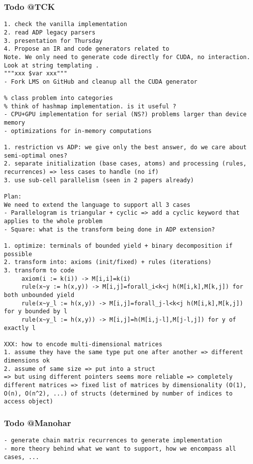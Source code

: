 \subsubsection*{Todo @TCK}
\begin{verbatim}
1. check the vanilla implementation
2. read ADP legacy parsers
3. presentation for Thursday
4. Propose an IR and code generators related to
Note. We only need to generate code directly for CUDA, no interaction. Look at string templating .
"""xxx $var xxx"""
- Fork LMS on GitHub and cleanup all the CUDA generator

% class problem into categories
% think of hashmap implementation. is it useful ?
- CPU+GPU implementation for serial (NS?) problems larger than device memory
- optimizations for in-memory computations

1. restriction vs ADP: we give only the best answer, do we care about semi-optimal ones?
2. separate initialization (base cases, atoms) and processing (rules, recurrences) => less cases to handle (no if)
3. use sub-cell parallelism (seen in 2 papers already)

Plan:
We need to extend the language to support all 3 cases
- Parallelogram is triangular + cyclic => add a cyclic keyword that applies to the whole problem
- Square: what is the transform being done in ADP extension?

1. optimize: terminals of bounded yield + binary decomposition if possible
2. transform into: axioms (init/fixed) + rules (iterations)
3. transform to code
     axiom(i := k(i)) -> M[i,i]=k(i)
     rule(x~y := h(x,y)) -> M[i,j]=forall_i<k<j h(M[i,k],M[k,j]) for both unbounded yield
     rule(x~y_l := h(x,y)) -> M[i,j]=forall_j-l<k<j h(M[i,k],M[k,j]) for y bounded by l
     rule(x~y_l := h(x,y)) -> M[i,j]=h(M[i,j-l],M[j-l,j]) for y of exactly l

XXX: how to encode multi-dimensional matrices
1. assume they have the same type put one after another => different dimensions ok
2. assume of same size => put into a struct
=> but using different pointers seems more reliable => completely different matrices => fixed list of matrices by dimensionality (O(1), O(n), O(n^2), ...) of structs (determined by number of indices to access object)
\end{verbatim}

\subsubsection*{Todo @Manohar}
\begin{verbatim}
- generate chain matrix recurrences to generate implementation
- more theory behind what we want to support, how we encompass all cases, ...
\end{verbatim}

